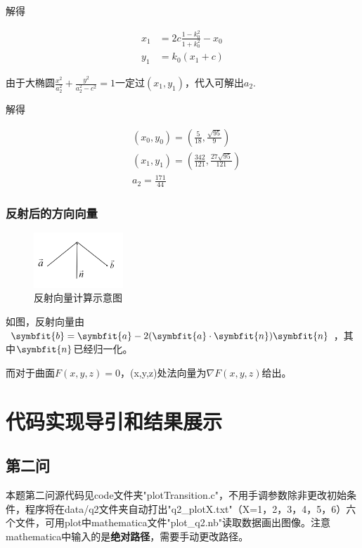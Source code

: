 \documentclass[10pt, a4paper]{article}
\newcommand\vbf{\symbfit}
\begin{document}
    解得

    \begin{align*}
        x_1&=2c\frac{1-k_0^2}{1+k_0^2}-x_0\\
        y_1&=k_0(x_1+c)
    \end{align*}

    由于大椭圆$\frac{x^2}{a_2^2}+\frac{y^2}{a_2^2-c^2}=1$一定过$(x_1,y_1)$，代入可解出$a_2$.

    解得

    \begin{align*}
        &(x_0,y_0)=(\frac{5}{18},\frac{\sqrt{95}}{9})\\
        &(x_1,y_1)=(\frac{342}{121},\frac{27\sqrt{95}}{121})\\
        &a_2=\frac{171}{44}
    \end{align*}

    \subsubsection{反射后的方向向量}

    \begin{figure}[H]
        \centering
        \includegraphics[width=0.3\textwidth]{反射向量计算示意图.png}
        \caption{反射向量计算示意图}\label{fig:反射向量计算示意图}
    \end{figure}

    如图，反射向量由$\vbf{b}=\vbf{a}-2(\vbf{a}\cdot\vbf{n})\vbf{n}$，其中$\vbf{n}$已经归一化。

    而对于曲面$F(x,y,z)=0$，(x,y,z)处法向量为$\nabla F(x,y,z)$给出。

    \section{代码实现导引和结果展示}

    \subsection{第二问}

    本题第二问源代码见code文件夹"plotTransition.c"，不用手调参数除非更改初始条件，程序将在data/q2文件夹自动打出"q2_plotX.txt"（X=1，2，3，4，5，6）六个文件，可用plot中mathematica文件"plot_q2.nb"读取数据画出图像。注意mathematica中输入的是\textbf{绝对路径}，需要手动更改路径。
\end{document}
